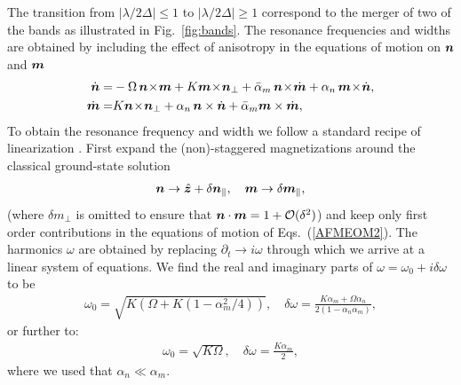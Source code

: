 The transition from $|\lambda/2\Delta|\le1$ to $|\lambda/2\Delta|\ge1$ correspond to the merger of two of the bands as illustrated in Fig.~\ref{fig:bands}. The resonance frequencies and widths are obtained by including the effect of anisotropy in the equations of motion on $\boldsymbol{n}$ and $\boldsymbol{m}$
\beml
\label{AFMEOM2}
\begin{align}
\label{ndot2}
\dot{\bb{n}} =& -\Omega\, \bb{n}\!\times\!\bb{m} +K \bb{m}\!\times\!\bb{n}_\perp+\bar{\alpha}_m\,\bb{n}\!\times\!\dot{\bb{m}}+\alpha_n\,\bb{m}\!\times\! \dot{\bb{n}},\\
\label{mdot2}
\dot{\bb{m}} =&K  \bb{n}\!\times\!\bb{n}_\perp+\alpha_n\,\bb{n} \times \dot{\bb{n}}+\bar{\alpha}_m \bb{m} \times \dot{\bb{m}} ,
\end{align}
\eml
To obtain the resonance frequency and width we follow a standard recipe of linearization \cite{kittel}. First expand the (non)-staggered magnetizations around the classical ground-state solution
\begin{align}
    \boldsymbol{n}\rightarrow\hat{\boldsymbol{z}} + \delta\boldsymbol{n}_\parallel,\quad \boldsymbol{m}\rightarrow \delta\boldsymbol{m}_\parallel,
\end{align} 
(where $\delta m_\perp$ is omitted to ensure that $\boldsymbol{n}\cdot\boldsymbol{m}=1+\mathcal{O}(\delta^2)$) and keep only first order contributions in the equations of motion of Eqs.~(\ref{AFMEOM2}). The harmonics $\omega$ are obtained by replacing $\partial_t \rightarrow i\omega$ through which we arrive at a linear system of equations. We find the real and imaginary parts of $\omega = \omega_0 + i \delta\omega$ to be
\begin{align}
    \omega_0 = \sqrt{K(\Omega + K(1- \alpha_m^2 / 4))},\quad \delta\omega =  \frac{K \alpha_m + \Omega \alpha_n }{2(1- \alpha_n \alpha_m)},
\end{align}
{\color{blue} or further to:
\begin{align}
    \omega_0 = \sqrt{K\Omega},\quad \delta\omega =  \frac{K \alpha_m}{2},
\end{align}
}
where we used that $\alpha_n\ll\alpha_m$.
